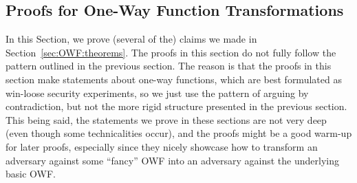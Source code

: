 \subsection{Proofs for One-Way Function Transformations}
In this Section, we prove (several of the) claims we made in Section~\ref{sec:OWF:theorems}.
The proofs in this section do not fully follow the pattern outlined in the previous section. The reason is that the proofs in this section make statements about one-way functions, which are best formulated as win-loose security experiments, so we just use the pattern of arguing by contradiction, but not the more rigid structure presented in the previous section. This being said, the statements we prove in these sections are not very deep (even though some technicalities occur), and the proofs might be a good warm-up for later proofs, especially since they nicely showcase how to transform an adversary against some ``fancy'' OWF into an adversary against the underlying basic OWF.

